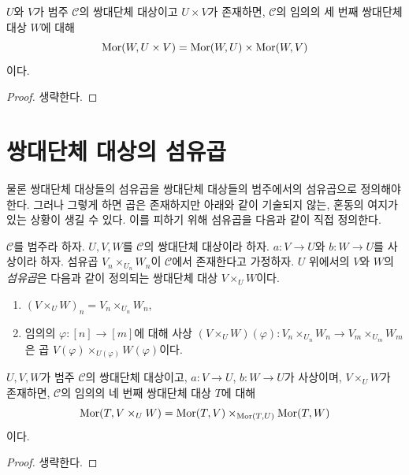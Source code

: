 \begin{lemma}
\label{lemma-product-cosimplicial-objects}
$U$와 $V$가 범주 $\mathcal{C}$의 쌍대단체 대상이고
$U \times V$가 존재하면, $\mathcal{C}$의 임의의 세 번째 쌍대단체 대상
$W$에 대해
$$
\mathop{\mathrm{Mor}}\nolimits(W, U \times V) =
\mathop{\mathrm{Mor}}\nolimits(W, U) \times
\mathop{\mathrm{Mor}}\nolimits(W, V)
$$
이다.
\end{lemma}

\begin{proof}
생략한다.
\end{proof}

\section{쌍대단체 대상의 섬유곱}
\label{section-fibre-products-cosimplicial}

\noindent
물론 쌍대단체 대상들의 섬유곱을 쌍대단체 대상들의 범주에서의
섬유곱으로 정의해야 한다. 그러나 그렇게 하면 곱은 존재하지만
아래와 같이 기술되지 않는, 혼동의 여지가 있는 상황이 생길 수 있다.
이를 피하기 위해 섬유곱을 다음과 같이 직접 정의한다.

\begin{definition}
\label{definition-fibre-product-cosimplicial-objects}
$\mathcal{C}$를 범주라 하자.
$U, V, W$를 $\mathcal{C}$의 쌍대단체 대상이라 하자.
$a : V \to U$와 $b : W \to U$를 사상이라 하자.
섬유곱 $V_n \times_{U_n} W_n$이 $\mathcal{C}$에서 존재한다고 가정하자.
{$U$ 위에서의 $V$와 $W$의 {\it 섬유곱}}은 다음과 같이 정의되는
쌍대단체 대상 $V \times_U W$이다.
\begin{enumerate}
\item $(V \times_U W)_n = V_n \times_{U_n} W_n$,
\item 임의의 $\varphi : [n] \to [m]$에 대해 사상
$(V \times_U W)(\varphi) : V_n \times_{U_n} W_n \to V_m \times_{U_m} W_m$은
곱 $V(\varphi) \times_{U(\varphi)} W(\varphi)$이다.
\end{enumerate}
\end{definition}

\begin{lemma}
\label{lemma-fibre-product-cosimplicial-objects}
$U, V, W$가 범주 $\mathcal{C}$의 쌍대단체 대상이고,
$a : V \to U$, $b : W \to U$가 사상이며,
$V \times_U W$가 존재하면, $\mathcal{C}$의 임의의 네 번째 쌍대단체 대상
$T$에 대해
$$
\mathop{\mathrm{Mor}}\nolimits(T, V \times_U W) =
\mathop{\mathrm{Mor}}\nolimits(T, V) \times_{\mathop{\mathrm{Mor}}\nolimits(T, U)}
\mathop{\mathrm{Mor}}\nolimits(T, W)
$$
이다.
\end{lemma}

\begin{proof}
생략한다.
\end{proof}

